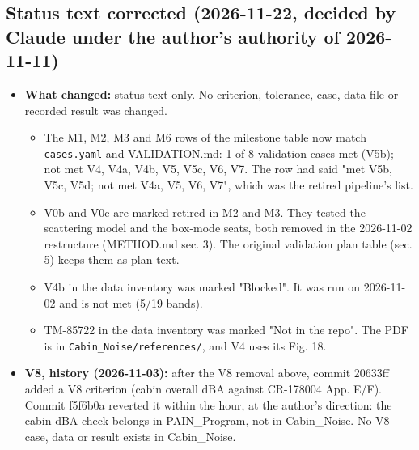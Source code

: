 \documentclass[10pt,a4paper]{article}
\begin{document}
\subsection*{Status text corrected (2026-11-22, decided by Claude under the author's authority of 2026-11-11)}

\begin{itemize}
\item \textbf{What changed:} status text only. No criterion, tolerance, case, data file or recorded result was changed.
\begin{itemize}
\item The M1, M2, M3 and M6 rows of the milestone table now match \texttt{cases.\allowbreak{}yaml} and VALIDATION.md: 1 of 8 validation cases met (V5b); not met V4, V4a, V4b, V5, V5c, V6, V7. The row had said "met V5b, V5c, V5d; not met V4a, V5, V6, V7", which was the retired pipeline's list.
\item V0b and V0c are marked retired in M2 and M3. They tested the scattering model and the box-mode seats, both removed in the 2026-11-02 restructure (METHOD.md sec. 3). The original validation plan table (sec. 5) keeps them as plan text.
\item V4b in the data inventory was marked "Blocked". It was run on 2026-11-02 and is not met (5/19 bands).
\item TM-85722 in the data inventory was marked "Not in the repo". The PDF is in \texttt{Cabin\_\allowbreak{}Noise/\allowbreak{}references/\allowbreak{}}, and V4 uses its Fig. 18.
\end{itemize}
\item \textbf{V8, history (2026-11-03):} after the V8 removal above, commit 20633ff added a V8 criterion (cabin overall dBA against CR-178004 App. E/F). Commit f5f6b0a reverted it within the hour, at the author's direction: the cabin dBA check belongs in PAIN\_Program, not in Cabin\_Noise. No V8 case, data or result exists in Cabin\_Noise.
\end{itemize}
\end{document}
